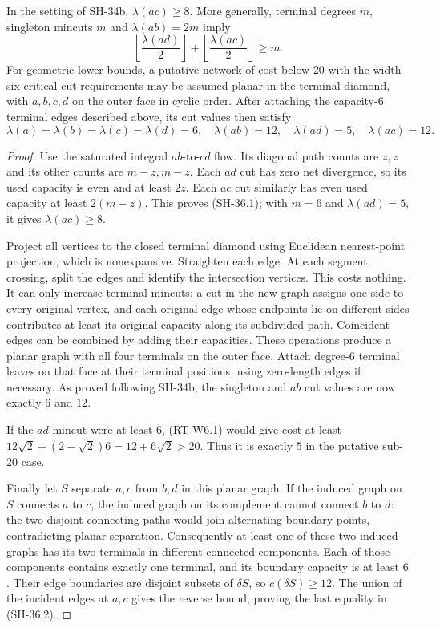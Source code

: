 \begin{lemma}
\label{lem:critical-planarization}
In the setting of SH-34b, $\lambda(ac)\ge8$.
More generally, terminal degrees $m$, singleton mincuts $m$
and $\lambda(ab)=2m$ imply
\[
 \left\lfloor\frac{\lambda(ad)}2\right\rfloor+
 \left\lfloor\frac{\lambda(ac)}2\right\rfloor\ge m.
                                                        \tag{SH-36.1}
\]
For geometric lower bounds, a putative network of cost below
$20$ with the width-six critical cut requirements may be
assumed planar in the terminal diamond, with $a,b,c,d$ on
the outer face in cyclic order.  After attaching the
capacity-$6$ terminal edges described above, its cut values
then satisfy
\[
 \lambda(a)=\lambda(b)=\lambda(c)=\lambda(d)=6,
 \quad \lambda(ab)=12,\quad \lambda(ad)=5,
 \quad \lambda(ac)=12.                                \tag{SH-36.2}
\]
\end{lemma}

\begin{proof}
Use the saturated integral $ab$-to-$cd$ flow.  Its diagonal
path counts are $z,z$ and its other counts are $m-z,m-z$.
Each $ad$ cut has zero net divergence, so its used capacity
is even and at least $2z$.  Each $ac$ cut similarly has
even used capacity at least $2(m-z)$.  This proves
(SH-36.1); with $m=6$ and $\lambda(ad)=5$, it gives
$\lambda(ac)\ge8$.

Project all vertices to the closed terminal diamond using
Euclidean nearest-point projection, which is nonexpansive.
Straighten each edge.  At each segment crossing, split the
edges and identify the intersection vertices.  This costs
nothing.  It can only increase terminal mincuts: a cut in
the new graph assigns one side to every original vertex,
and each original edge whose endpoints lie on different
sides contributes at least its original capacity along
its subdivided path.  Coincident edges can be combined by
adding their capacities.  These operations produce a
planar graph with all four terminals on the outer face.
Attach degree-$6$ terminal leaves on that face at their
terminal positions, using zero-length edges if necessary.
As proved following SH-34b, the singleton and $ab$ cut
values are now exactly $6$ and $12$.

If the $ad$ mincut were at least $6$, (RT-W6.1) would give
cost at least
$12\sqrt2+(2-\sqrt2)6=12+6\sqrt2>20$.
Thus it is exactly $5$ in the putative sub-$20$ case.

Finally let $S$ separate $a,c$ from $b,d$ in this planar
graph.  If the induced graph on $S$ connects $a$ to $c$,
the induced graph on its complement cannot connect $b$
to $d$: the two disjoint connecting paths would join
alternating boundary points, contradicting planar separation.
Consequently at least one of these two induced graphs has
its two terminals in different connected components.
Each of those components contains exactly one terminal,
and its boundary capacity is at least $6$.  Their edge
boundaries are disjoint subsets of $\delta S$, so
$c(\delta S)\ge12$.  The union of the incident edges at
$a,c$ gives the reverse bound, proving the last equality
in (SH-36.2).
\end{proof}

